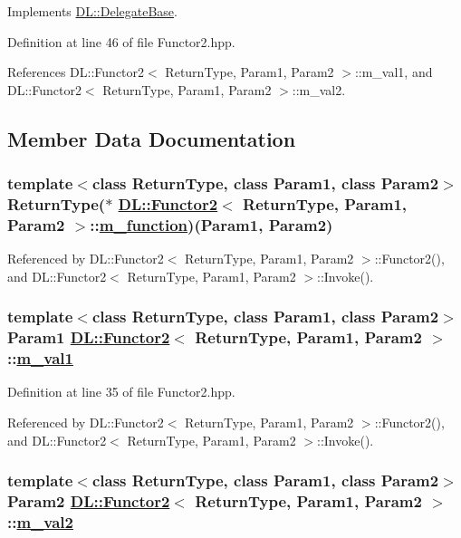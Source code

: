 Implements \hyperlink{classDL_1_1DelegateBase_a2}{DL::Delegate\-Base}.

Definition at line 46 of file Functor2.hpp.

References DL::Functor2$<$ Return\-Type, Param1, Param2 $>$::m\_\-val1, and DL::Functor2$<$ Return\-Type, Param1, Param2 $>$::m\_\-val2.

\subsection{Member Data Documentation}
\hypertarget{classDL_1_1Functor2_r0}{
\subsubsection[m\_\-function]{\setlength{\rightskip}{0pt plus 5cm}template$<$class Return\-Type, class Param1, class Param2$>$ Return\-Type($\ast$ \hyperlink{classDL_1_1Functor2}{DL::Functor2}$<$ Return\-Type, Param1, Param2 $>$::\hyperlink{classDL_1_1Functor2_r0}{m\_\-function})(Param1, Param2)}}
\label{classDL_1_1Functor2_r0}




Referenced by DL::Functor2$<$ Return\-Type, Param1, Param2 $>$::Functor2(), and DL::Functor2$<$ Return\-Type, Param1, Param2 $>$::Invoke().\hypertarget{classDL_1_1Functor2_r1}{
\subsubsection[m\_\-val1]{\setlength{\rightskip}{0pt plus 5cm}template$<$class Return\-Type, class Param1, class Param2$>$ Param1 \hyperlink{classDL_1_1Functor2}{DL::Functor2}$<$ Return\-Type, Param1, Param2 $>$::\hyperlink{classDL_1_1Functor2_r1}{m\_\-val1}}}
\label{classDL_1_1Functor2_r1}




Definition at line 35 of file Functor2.hpp.

Referenced by DL::Functor2$<$ Return\-Type, Param1, Param2 $>$::Functor2(), and DL::Functor2$<$ Return\-Type, Param1, Param2 $>$::Invoke().\hypertarget{classDL_1_1Functor2_r2}{
\subsubsection[m\_\-val2]{\setlength{\rightskip}{0pt plus 5cm}template$<$class Return\-Type, class Param1, class Param2$>$ Param2 \hyperlink{classDL_1_1Functor2}{DL::Functor2}$<$ Return\-Type, Param1, Param2 $>$::\hyperlink{classDL_1_1Functor2_r2}{m\_\-val2}}}
\label{classDL_1_1Functor2_r2}




